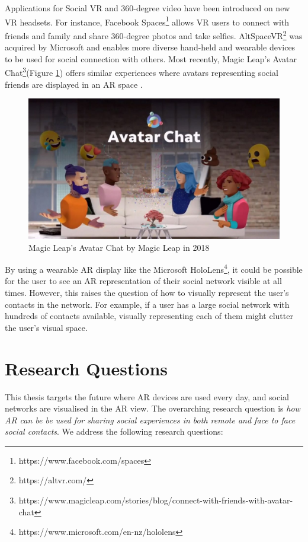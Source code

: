 Applications for Social VR and 360-degree video have been introduced on new VR headsets. For instance, Facebook Spaces\footnote{https://www.facebook.com/spaces} allows VR users to connect with friends and family and share 360-degree photos and take selfies. AltSpaceVR\footnote{https://altvr.com/} was acquired by Microsoft and enables more diverse hand-held and wearable devices to be used for social connection with others. Most recently, Magic Leap's Avatar Chat\footnote{https://www.magicleap.com/stories/blog/connect-with-friends-with-avatar-chat}(Figure \ref{fig:ml-avatar-chat}) offers similar experiences where avatars representing social friends are displayed in an AR space . 


\begin{figure}
    \centering
    \includegraphics[width=.8\linewidth]{images/magic-leap-avatar-chat.jpg}
    \caption{Magic Leap's Avatar Chat by Magic Leap in 2018}
    \label{fig:ml-avatar-chat}
\end{figure}

By using a wearable AR display like the Microsoft HoloLens\footnote{https://www.microsoft.com/en-nz/hololens}, it could be possible for the user to see an AR representation of their social network visible at all times. However, this raises the question of how to visually represent the user's contacts in the network. For example, if a user has a large social network with hundreds of contacts available, visually representing each of them might clutter the user's visual space.

\section{Research Questions}

This thesis targets the future where AR devices are used every day, and social networks are visualised in the AR view. The overarching research question is \textit{how AR can be be used for sharing social experiences in both remote and face to face social contacts}. We address the following research questions: 

